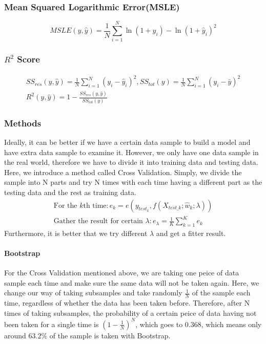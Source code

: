 \documentclass{article}
\begin{document}
	\subsubsection{Mean Squared Logarithmic Error(MSLE)}
	\begin{displaymath}
		MSLE(y,\hat{y}) = \frac{1}{N} \sum_{i=1}^{N}{\ln(1+y_i) - \ln(1+\hat{y}_i)^2}
	\end{displaymath}
	\subsubsection{$R^2$ Score}
	\begin{gather*}
		SS_{res}(y,\hat{y}) = \frac{1}{N} \sum_{i=1}^{N}(y_i-\hat{y}_i)^2,SS_{tot}(y) = \frac{1}{N}\sum_{i=1}^{N}(y_i - \bar{y})^2\\
		R^2(y,\hat{y}) = 1 - \frac{SS_{res}(y,\hat{y})}{SS_{tot}(y)}
	\end{gather*}
	\subsubsection{Methods}
	Ideally, it can be better if we have a certain data sample to build a model and have extra data sample to examine it. However, we only have one data sample in the real world, therefore we have to divide it into training data and testing data. Here, we introduce a method called Cross Validation. Simply, we divide the sample into N parts and try N times with each time having a different part as the testing data and the rest as training data.
	\begin{gather*}
		\mbox{For the $k$th time}:e_k = e(y_{test_k},f(X_{test\_k};\hat{w}_k;\lambda))\\
		\mbox{Gather the result for certain $\lambda$}:e_\lambda = \frac{1}{K} \sum_{k=1}^{K}e_k
	\end{gather*}
	Furthermore, it is better that we try different $\lambda$ and get a fitter result.
	\paragraph{Bootstrap}
	For the Cross Validation mentioned above, we are taking one peice of data sample each time and make sure the same data will not be taken again. Here, we change our way of taking subsamples and take randomly $\frac{1}{N}$ of the sample each time, regardless of whether the data has been taken before. Therefore, after N times of taking subsamples, the probability of a certain peice of data having not been taken for a single time is $(1-\frac{1}{N})^N$, which goes to 0.368, which means only around $63.2\%$ of the sample is taken with Bootstrap.
\end{document}
